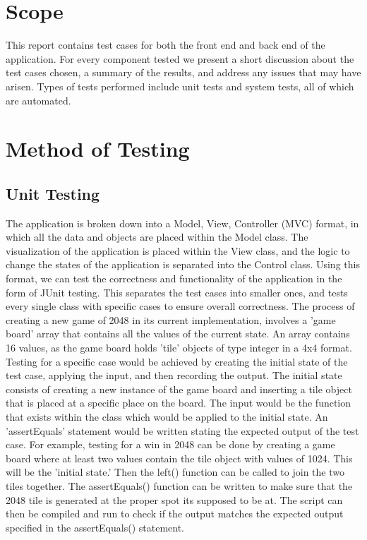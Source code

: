 \documentclass[12pt]{article}
\begin{document}
\section{Scope}
This report contains test cases for both the front end and back end of the application. For every component tested we present a short discussion about the test cases chosen, a summary of the results, and address any issues that may have arisen. Types of tests performed include unit tests and system tests, all of which are automated.

\section {Method of Testing}

\subsection {Unit Testing}
The application is broken down into a Model, View, Controller (MVC) format, in which all the data and objects are placed within the Model class. The visualization of the application is placed within the View class, and the logic to change the states of the application is separated into the Control class. Using this format, we can test the correctness and functionality of the application in the form of JUnit testing. This separates the test cases into smaller ones, and tests every single class with specific cases to ensure overall correctness. The process of creating a new game of 2048 in its current implementation, involves a 'game board' array that contains all the values of the current state. An array contains 16 values, as the game board holds 'tile' objects of type integer in a 4x4 format. Testing for a specific case would be achieved by creating the initial state of the test case, applying the input, and then recording the output. The initial state consists of creating a new instance of the game board and inserting a tile object that is placed at a specific place on the board. The input would be the function that exists within the class which would be applied to the initial state.  An 'assertEquals' statement would be written stating the expected output of the test case.  For example, testing for a win in 2048 can be done by creating a game board where at least two values contain the tile object with values of 1024. This will be the 'initial state.' Then the left() function can be called to join the two tiles together. The assertEquals() function can be written to make sure that the 2048 tile is generated at the proper spot its supposed to be at. The script can then be compiled and run to check if the output matches the expected output specified in the assertEquals() statement.
\end{document}
